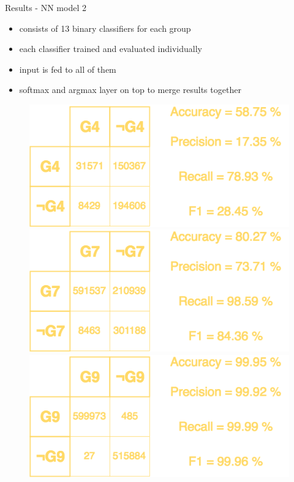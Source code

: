 \documentclass{beamer}
\begin{document}
\begin{darkframes}
    \begin{frame}{Results - NN model 2}
      \begin{itemize}
        \item consists of 13 binary classifiers for each group
        \item each classifier trained and evaluated individually
        \item input is fed to all of them
        \item softmax and argmax layer on top to merge results together
      \end{itemize}
      \begin{figure}[H]
        \begin{minipage}{.33\textwidth}         
          \centering
          \includegraphics[width=0.95\linewidth]{../tex/images/results/rese_g4_512_img}
        \end{minipage}%
        \begin{minipage}{.33\textwidth}         
          \centering
          \includegraphics[width=0.95\linewidth]{../tex/images/results/rese_g7_512_img}
        \end{minipage}%
        \begin{minipage}{.33\textwidth}         
          \centering
          \includegraphics[width=0.95\linewidth]{../tex/images/results/rese_g9_512_img}

\end{minipage}
\end{figure}
\end{frame}
\end{darkframes}
\end{document}

